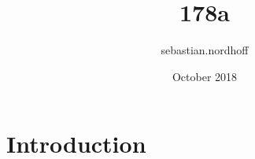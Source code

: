 \documentclass{article}
\title{178a}
\author{sebastian.nordhoff }
\date{October 2018}
\begin{document}
\maketitle

\section{Introduction}
\end{document}
